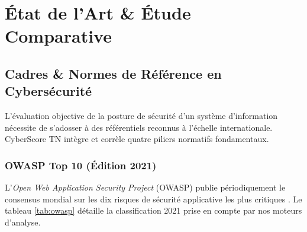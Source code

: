 \chapter{État de l'Art \& Étude Comparative}
\label{chap:art}

\section{Cadres \& Normes de Référence en Cybersécurité}
L'évaluation objective de la posture de sécurité d'un système d'information nécessite de s'adosser à des référentiels reconnus à l'échelle internationale. CyberScore TN intègre et corrèle quatre piliers normatifs fondamentaux.

\subsection{OWASP Top 10 (Édition 2021)}
L'\textit{Open Web Application Security Project} (OWASP) publie périodiquement le consensus mondial sur les dix risques de sécurité applicative les plus critiques \cite{owasp2021}. Le tableau \ref{tab:owasp} détaille la classification 2021 prise en compte par nos moteurs d'analyse.


